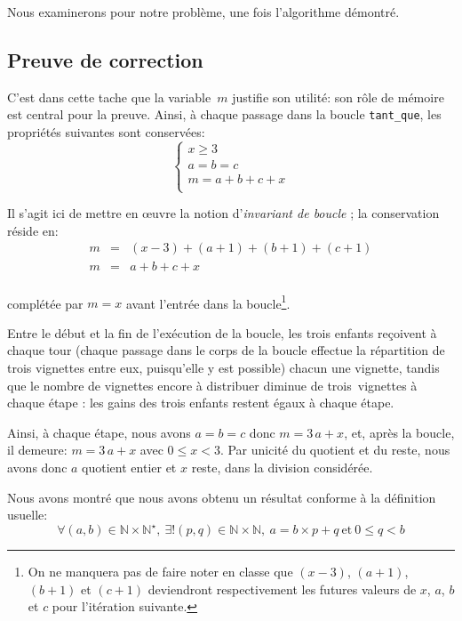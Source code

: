 Nous examinerons pour notre problème, une fois l'algorithme démontré.

\subsection{Preuve de correction}

C'est dans cette tache que la variable~$m$ justifie son utilité: son rôle de mémoire est central pour la preuve. Ainsi, à chaque passage dans la boucle \texttt{tant\_que}, les propriétés suivantes sont conservées:
\[
\left\lbrace
\begin{array}{l}
x \geqslant 3 \\
a = b = c \\
m = a + b + c + x \\
\end{array}
\right.
\]

Il s'agit ici de mettre en œuvre la notion d'\emph{invariant de boucle} ; la conservation réside en:
\[
\begin{array}{lcl}
m & = & \left(x - 3\right) + \left(a + 1\right) + \left(b + 1\right) + \left(c + 1\right) \\
m & = & a + b + c + x \\
\end{array}
\]

complétée par $m = x$ avant l'entrée dans la boucle\footnote{On ne manquera pas de faire noter en classe que $\left(x - 3\right)$, $\left(a + 1\right)$, $\left(b + 1\right)$ et $\left(c + 1\right)$ deviendront respectivement les futures valeurs de $x$, $a$, $b$ et $c$ pour l'itération suivante.}.

Entre le début et la fin de l'exécution de la boucle, les trois enfants reçoivent à chaque tour (chaque passage dans le corps de la boucle effectue la répartition de trois vignettes entre eux, puisqu'elle y est possible) chacun une vignette, tandis que le nombre de vignettes encore à distribuer diminue de trois~vignettes à chaque étape : les gains des trois enfants restent égaux à chaque étape.

Ainsi, à chaque étape, nous avons $a = b = c$ donc $m = 3\,a + x$, et, après la boucle, il demeure: $m = 3\,a + x$ avec $0 \leqslant x < 3$. Par unicité du quotient et du reste, nous avons donc $a$ quotient entier et $x$ reste, dans la division considérée.

Nous avons montré que nous avons obtenu un résultat conforme à la définition usuelle:
\[
\forall \left( a , b \right) \in \mathbb{N} \times \mathbb{N}^{\star},\ \exists! \left( p , q \right) \in \mathbb{N} \times \mathbb{N}, \ a = b \times p + q \ \text{et}\ 0 \leqslant q < b
\]

